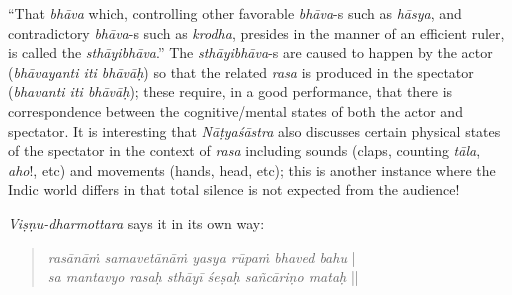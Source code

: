 “That \textsl{bhāva} which, controlling other favorable \textsl{bhāva}-s such as \textsl{hāsya}, and contradictory \textsl{bhāva}-s such as \textsl{krodha}, presides in the manner of an efficient ruler, is called the \textsl{sthāyibhāva}.” The \textsl{sthāyibhāva}-s are caused to happen by the actor (\textsl{bhāvayanti iti bhāvāḥ}) so that the related \textsl{rasa} is produced in the spectator (\textsl{bhavanti iti bhāvāḥ}); these require, in a good performance, that there is correspondence between the cognitive/mental states of both the actor and spectator. It is interesting that \textsl{Nāṭyaśāstra} also discusses certain physical states of the spectator in the context of \textsl{rasa} including sounds (claps, counting \textsl{tāla}, \textsl{aho}!, etc) and movements (hands, head, etc); this is another instance where the Indic world differs in that total silence is not expected from the audience!

\vskip 1pt

\textsl{Viṣṇu-dharmottara} says it in its own way:
\begin{quote}
\textsl{rasānāṁ samavetānāṁ yasya rūpaṁ bhaved bahu} |\\[1pt]
\textsl{sa mantavyo rasaḥ sthāyī śeṣaḥ sañcāriṇo mataḥ} ||
\end{quote}

